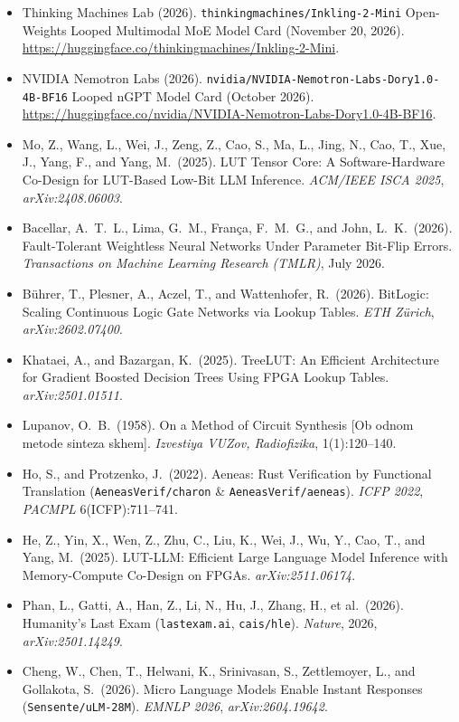 \documentclass[10pt]{article}
\begin{document}
{\begin{itemize}
  \item Thinking Machines Lab (2026). \texttt{thinkingmachines/Inkling-2-Mini} Open-Weights Looped Multimodal MoE Model Card (November 20, 2026). \url{https://huggingface.co/thinkingmachines/Inkling-2-Mini}.
  \item NVIDIA Nemotron Labs (2026). \texttt{nvidia/NVIDIA-Nemotron-Labs-Dory1.0-4B-BF16} Looped nGPT Model Card (October 2026). \url{https://huggingface.co/nvidia/NVIDIA-Nemotron-Labs-Dory1.0-4B-BF16}.
  \item Mo, Z., Wang, L., Wei, J., Zeng, Z., Cao, S., Ma, L., Jing, N., Cao, T., Xue, J., Yang, F., and Yang, M.\ (2025). LUT Tensor Core: A Software-Hardware Co-Design for LUT-Based Low-Bit LLM Inference. \emph{ACM/IEEE ISCA 2025}, \emph{arXiv:2408.06003}.
  \item Bacellar, A.\ T.\ L., Lima, G.\ M., Fran\c{c}a, F.\ M.\ G., and John, L.\ K.\ (2026). Fault-Tolerant Weightless Neural Networks Under Parameter Bit-Flip Errors. \emph{Transactions on Machine Learning Research (TMLR)}, July 2026.
  \item B\"uhrer, T., Plesner, A., Aczel, T., and Wattenhofer, R.\ (2026). BitLogic: Scaling Continuous Logic Gate Networks via Lookup Tables. \emph{ETH Z\"urich}, \emph{arXiv:2602.07400}.
  \item Khataei, A., and Bazargan, K.\ (2025). TreeLUT: An Efficient Architecture for Gradient Boosted Decision Trees Using FPGA Lookup Tables. \emph{arXiv:2501.01511}.
  \item Lupanov, O.\ B.\ (1958). On a Method of Circuit Synthesis [Ob odnom metode sinteza skhem]. \emph{Izvestiya VUZov, Radiofizika}, 1(1):120--140.
  \item Ho, S., and Protzenko, J.\ (2022). Aeneas: Rust Verification by Functional Translation (\texttt{AeneasVerif/charon} \& \texttt{AeneasVerif/aeneas}). \emph{ICFP 2022}, \emph{PACMPL} 6(ICFP):711--741.
  \item He, Z., Yin, X., Wen, Z., Zhu, C., Liu, K., Wei, J., Wu, Y., Cao, T., and Yang, M.\ (2025). LUT-LLM: Efficient Large Language Model Inference with Memory-Compute Co-Design on FPGAs. \emph{arXiv:2511.06174}.
  \item Phan, L., Gatti, A., Han, Z., Li, N., Hu, J., Zhang, H., et al.\ (2026). Humanity's Last Exam (\texttt{lastexam.ai}, \texttt{cais/hle}). \emph{Nature}, 2026, \emph{arXiv:2501.14249}.
  \item Cheng, W., Chen, T., Helwani, K., Srinivasan, S., Zettlemoyer, L., and Gollakota, S.\ (2026). Micro Language Models Enable Instant Responses (\texttt{Sensente/uLM-28M}). \emph{EMNLP 2026}, \emph{arXiv:2604.19642}.

\end{itemize}}
\end{document}
